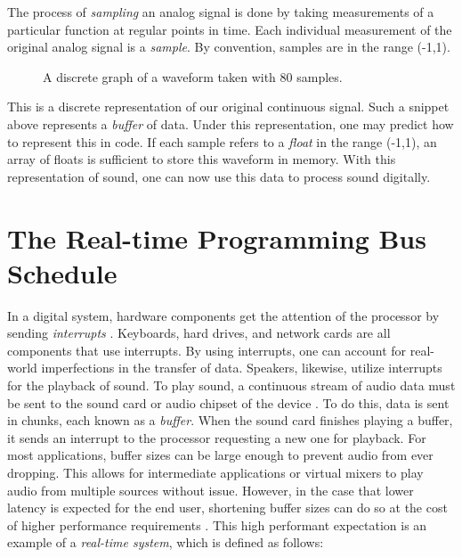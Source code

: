 The process of \textit{sampling} an analog signal is done by taking measurements of a particular function at regular points in time. Each individual measurement of the original analog signal is a \textit{sample}. By convention, samples are in the range (-1,1).

\begin{figure}[h] %
	\begin{center}
		\caption{A discrete graph of a waveform taken with 80 samples.}
	\end{center}
\end{figure}

This is a discrete representation of our original continuous signal. Such a snippet above represents a \textit{buffer} of data. Under this representation, one may predict how to represent this in code. If each sample refers to a \textit{float} in the range (-1,1), an array of floats is sufficient to store this waveform in memory. With this representation of sound, one can now use this data to process sound digitally.

\section{The Real-time Programming Bus Schedule}

In a digital system, hardware components get the attention of the processor by sending \textit{interrupts} \cite{Rubini2005-kv}. Keyboards, hard drives, and network cards are all components that use interrupts. By using interrupts, one can account for real-world imperfections in the transfer of data. Speakers, likewise, utilize interrupts for the playback of sound. To play sound, a continuous stream of audio data must be sent to the sound card or audio chipset of the device \cite{Walker_2005}. To do this, data is sent in chunks, each known as a \textit{buffer}. When the sound card finishes playing a buffer, it sends an interrupt to the processor requesting a new one for playback. For most applications, buffer sizes can be large enough to prevent audio from ever dropping. This allows for intermediate applications or virtual mixers to play audio from multiple sources without issue. However, in the case that lower latency is expected for the end user, shortening buffer sizes can do so at the cost of higher performance requirements \cite{corless2009pc-based}. This high performant expectation is an example of a \textit{real-time system}, which is defined as follows:

